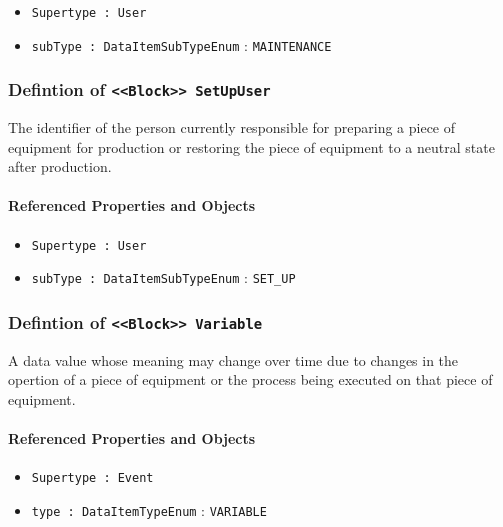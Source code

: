 \begin{itemize}
\item \texttt{Supertype : User}

\item \texttt{subType : DataItemSubTypeEnum} : \texttt{MAINTENANCE}

\end{itemize}
\FloatBarrier
\subsubsection{Defintion of \texttt{<<Block>> SetUpUser}}
  \label{type:SetUpUser}

\FloatBarrier

The identifier of the person currently responsible for preparing a piece of equipment for production or restoring the piece of equipment to a neutral state after production.

\FloatBarrier
\paragraph{Referenced Properties and Objects}

\begin{itemize}
\item \texttt{Supertype : User}

\item \texttt{subType : DataItemSubTypeEnum} : \texttt{SET_UP}

\end{itemize}
\FloatBarrier
\subsubsection{Defintion of \texttt{<<Block>> Variable}}
  \label{type:Variable}

\FloatBarrier

A data value whose meaning may change over time due to changes in the opertion of a piece of equipment or the process being executed on that piece of equipment.

\FloatBarrier
\paragraph{Referenced Properties and Objects}

\begin{itemize}
\item \texttt{Supertype : Event}

\item \texttt{type : DataItemTypeEnum} : \texttt{VARIABLE}

\end{itemize}
\FloatBarrier
